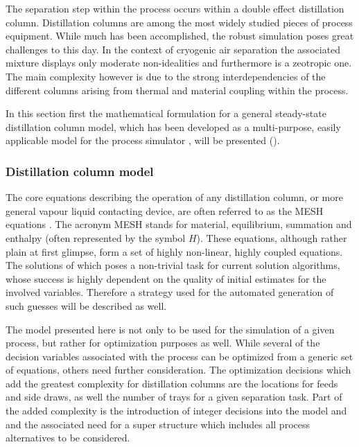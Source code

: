     The separation step within the process occurs within a double effect distillation column.
    Distillation columns are among the most widely studied pieces of process equipment. While much has been
    accomplished, the robust simulation poses great challenges to this day. In the context of cryogenic
    air separation the associated mixture displays only moderate non-idealities and furthermore is
    a zeotropic one. The main complexity however is due to the strong interdependencies of the different
    columns arising from thermal and material coupling within the process.

    In this section first the mathematical formulation for a general steady-state distillation column model,
    which has been developed as a multi-purpose, easily applicable model for the process simulator \gproms,
    will be presented ().

    \subsubsection{Distillation column model}
    \label{sec:mathpro:steady:distmodel}

        The core equations describing the operation of any distillation column, or more general vapour liquid contacting
        device, are often referred to as the MESH equations \cite{Kister.1992}. The acronym
        MESH stands for material, equilibrium, summation and enthalpy (often represented by the symbol $H$). These equations, although
        rather plain at first glimpse, form a set of highly non-linear, highly coupled equations. The solutions of which
        poses a non-trivial task for current solution algorithms, whose success is highly dependent on the quality of
        initial estimates for the involved variables. Therefore a strategy used for the automated generation of such
        guesses will be described as well.

        The model presented here is not only to be used for the simulation of a given process, but rather
        for optimization purposes as well. While several of the decision variables associated
        with the  process can be optimized from a generic set of equations, others need further consideration.
        The optimization decisions which add the greatest complexity for distillation columns are the locations for feeds
        and side draws, as well the number of trays for a given separation task. Part of the added complexity is
        the introduction of integer decisions into the model and and the associated need for a super structure which
        includes all process alternatives to be considered.

